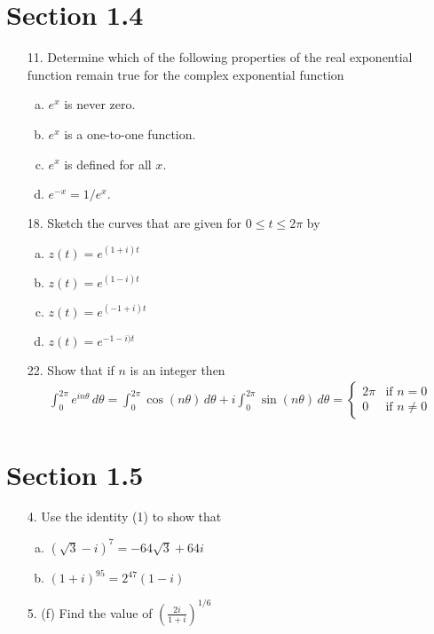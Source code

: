 \documentclass{article}
\begin{document}
\section*{Section 1.4}

\begin{itemize}
	\item[11.] Determine which of the following properties of the real exponential function remain true for the complex exponential function
		\begin{enumerate}[(a)]
			\item $e^x$ is never zero.

			\item $e^x$ is a one-to-one function.

			\item $e^x$ is defined for all $x.$

			\item $e^{-x}=1/e^x.$
				
		\end{enumerate}

	\item[18.] Sketch the curves that are given for $0\le t\le 2\pi$ by
		\begin{enumerate}[(a)]
			\item $z(t)=e^{(1+i)t}$ 
				
			\item $z(t)=e^{(1-i)t}$ 

			\item $z(t)=e^{(-1+i)t}$

			\item $z(t)=e^{-1-i)t}$
				
		\end{enumerate}

	\item[22.] Show that if $n$ is an integer then
		\begin{align*}
			\int_0^{2\pi} e^{in\theta}\, d\theta = \int_0^{2\pi}\cos(n\theta)\, d\theta + i\int_0^{2\pi}\sin(n\theta)\, d\theta = \begin{cases}
				2\pi & \text{if }n=0 \\
				0 &\text{if }n\neq 0
			\end{cases}
		\end{align*}
		
\end{itemize}

\section*{Section 1.5}

\begin{itemize}
	\item[4.] Use the identity (1) to show that
		\begin{enumerate}[(a)]
			\item $(\sqrt{3}-i)^7=-64\sqrt{3}+64i$

			\item $(1+i)^{95}=2^{47}(1-i)$
				
		\end{enumerate}

	\item[5.] (f) Find the value of $\left( \frac{2i}{1+i} \right)^{1/6}$

\end{itemize}
\end{document}
